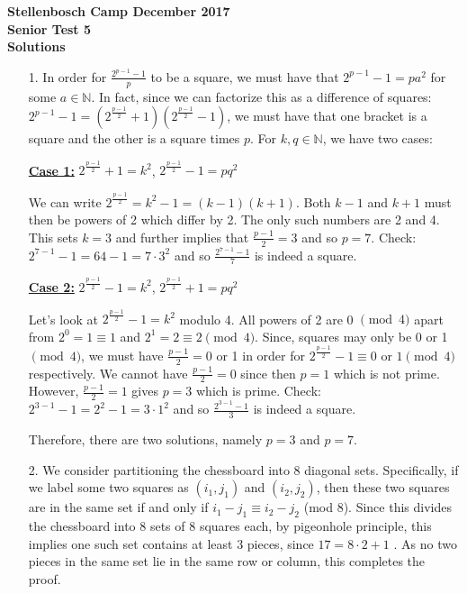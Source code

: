 \documentclass[a4paper, 12pt]{article}
\begin{document}
\begin{center}
\textbf{Stellenbosch Camp December 2017 \\ Senior Test 5} \\
\textbf{Solutions}
\end{center}


\begin{enumerate}

    \item[1.] In order for $\frac{2^{p-1}-1}{p}$ to be a square, we must have that $2^{p-1}-1 = p a^2$ for some $a\in \mathbb{N}$. In fact, since we can factorize this as a difference of squares:  $2^{p-1}-1 = (2^\frac{p-1}{2}+1)(2^\frac{p-1}{2}-1)$, we must have that one bracket is a square and the other is a square times $p$. For $k,q \in \mathbb{N}$, we have two cases:
  
  \underline{\textbf{Case 1:}} $2^\frac{p-1}{2}+1=k^2$, $2^\frac{p-1}{2}-1 = pq^2$

  We can write $2^\frac{p-1}{2} = k^2-1 = (k-1)(k+1)$. Both $k-1$ and $k+1$ must then be powers of 2 which differ by 2. The only such numbers are 2 and 4. This sets $k=3$ and further implies that $\frac{p-1}{2}=3$ and so $p=7$. Check: $2^{7-1}-1 = 64-1 = 7\cdot 3^2$ and so $\frac{2^{7-1}-1}{7}$ is indeed a square.
  
  \underline{\textbf{Case 2:}} $2^\frac{p-1}{2}-1=k^2$, $2^\frac{p-1}{2}+1 = pq^2$
  
  Let's look at $2^\frac{p-1}{2}-1=k^2$ modulo 4. All powers of 2 are 0 $\pmod{4}$ apart from $2^0=1 \equiv 1$ and $2^1=2 \equiv 2 \pmod{4}$. Since, squares may only be 0 or 1 $\pmod{4}$, we must have $\frac{p-1}{2} = 0$ or 1 in order for $2^\frac{p-1}{2}-1 \equiv 0$ or $1 \pmod{4}$ respectively. We cannot have $\frac{p-1}{2} = 0$ since then $p=1$ which is not prime. However, $\frac{p-1}{2} = 1$ gives $p=3$ which is prime. Check: $2^{3-1}-1 = 2^2-1 = 3\cdot 1^2$ and so $\frac{2^{3-1}-1}{3}$ is indeed a square. 
  
  Therefore, there are two solutions, namely $p=3$ and $p=7$.
    
    
    \item[2.] We consider partitioning the chessboard into 8 diagonal sets. Specifically, if we label some two squares as $(i_1, j_1)$ and $(i_2, j_2)$, then these two squares are in the same set if and only if $i_1 - j_1 \equiv i_2 - j_2$ (mod 8). Since this divides the chessboard into 8 sets of 8 squares each, by pigeonhole principle, this implies one such set contains at least 3 pieces, since $17 = 8 \cdot 2 + 1$ . As no two pieces in the same set lie in the same row or column, this completes the proof.
    

\end{enumerate}
\end{document}
